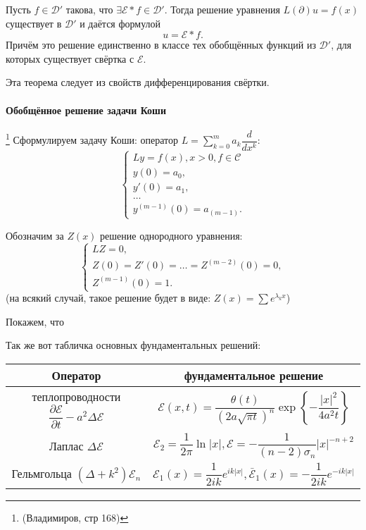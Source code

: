 \begin{theorem}
  Пусть $f \in \mathcal{D}'$ такова, что $\exists \mathcal{E} * f \in \mathcal{D}'$. Тогда решение
  уравнения $L(\partial) u = f(x)$ существует в $\mathcal{D}'$ и даётся формулой
  \[
    u = \mathcal{E} * f.
  \]
  Причём это решение единственно в классе тех обобщённых функций из $\mathcal{D}'$, для которых
  существует свёртка с $\mathcal{E}$.
\end{theorem}
Эта теорема следует из свойств дифференцирования свёртки.



\paragraph{Обобщённое решение задачи Коши} \footnote{(Владимиров, стр 168)}
Сформулируем задачу Коши: оператор $L = \sum_{k=0}^m a_k \dfrac{d}{dx^k}$:
\[
  \begin{cases}
    Ly = f(x), x > 0, f \in \mathcal{C} \\
    y(0) = a_0, \\
    y'(0) = a_1, \\
    \dots \\
    y^{(m-1)} (0) = a_{(m-1)}.
  \end{cases}
\]



Обозначим за $Z(x)$ решение однородного уравнения:
\[
  \begin{cases}
    LZ = 0, \\
    Z(0) = Z'(0) = \dots = Z^{(m-2)} (0) = 0, \\
    Z^{(m-1)} (0) = 1.
  \end{cases}
\]
(на всякий случай, такое решение будет в виде: $Z(x) = \sum e^{\lambda_k x}$)

Покажем, что 


Так же вот табличка основных фундаментальных решений:
\begin{center}
  \begin{tabular}{|c|c|}
    \hline
    Оператор & фундаментальное решение \\
    \hline
    теплопроводности $\dfrac{\partial \mathcal{E}}{\partial t} - a^2 \Delta \mathcal{E}$ &
    $\mathcal{E} (x, t) = \dfrac{\theta(t)}{(2a \sqrt{\pi t})^n} \exp \left\{ -\dfrac{|x|^2}{4a^2 t} \right\}$ \\
    
    \hline
    Лаплас $\Delta \mathcal{E}$ &
    $\mathcal{E}_2 = \dfrac{1}{2\pi} \ln |x|, \mathcal{E} = -\dfrac{1}{(n-2) \sigma_n} |x|^{-n+2}$ \\
    \hline 
    Гельмгольца $(\Delta + k^2) \mathcal{E}_n$ &
    $\mathcal{E}_1 (x) = \dfrac{1}{2ik} e^{ik |x|}, \bar{\mathcal{E}}_1 (x) = - \dfrac{1}{2ik} e^{-ik|x|}$ \\
    \hline
  \end{tabular}
\end{center}


